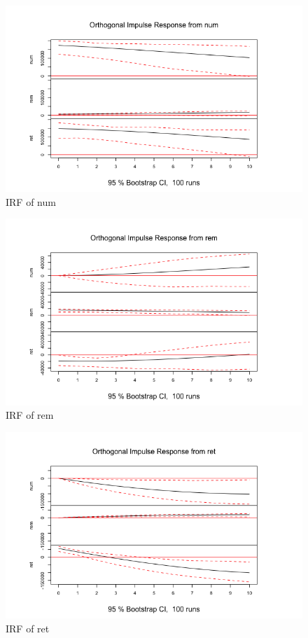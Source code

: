 \documentclass[a4paper]{article}
\begin{document}
\begin{figure}[h!]
\centering
\includegraphics[scale=0.4]{images/irf_num.png}
\caption{IRF of num}
\label{fig:irf_num}
\end{figure}

\begin{figure}[h!]
\centering
\includegraphics[scale=0.4]{images/irf_rem.png}
\caption{IRF of rem}
\label{fig:irf_rem}
\end{figure}

\begin{figure}[h!]
\centering
\includegraphics[scale=0.4]{images/irf_ret.png}
\caption{IRF of ret}
\label{fig:irf_ret}
\end{figure}
\end{document}
